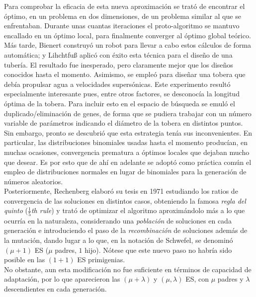 \documentclass[12pt]{article} \usepackage[utf8]{inputenc}
\begin{document}
Para comprobar la eficacia de esta nueva aproximación se trató de
encontrar el óptimo, en un problema en dos dimensiones, de un problema
similar al que se enfrentaban. Durante unas cuantas iteraciones el
proto-algoritmo se mantuvo encallado en un óptimo local, para
finalmente converger al óptimo global teórico. \\

Más tarde, Bienert construyó un robot para llevar a cabo estos
cálculos de forma automática; y Lihchtfu{\ss} aplicó con éxito esta técnica para
el diseño de una tubería. El resultado fue inesperado, pero claramente
mejor que los diseños conocidos hasta el momento. Asimismo, se empleó
para diseñar una tobera que debía propulsar agua a velocidades
supersónicas. Este experimento resultó especialmente interesante pues,
entre otros factores, se desconocía la longitud óptima de la
tobera. Para incluir esto en el espacio de búsqueda se emuló el
duplicado/eliminación de genes, de forma que se pudiera trabajar con un número
variable de parámetros indicando el diámetro de la tobera en distintos
puntos. \\

Sin embargo, pronto se descubrió que esta estrategia tenía sus
inconvenientes. En particular, las distribuciones binomiales usadas
hasta el momento producían, en muchas ocasiones, convergencia
prematura a óptimos locales que dejaban mucho que desear. Es por esto
que de ahí en adelante se adoptó como práctica común el empleo de
distribuciones normales en lugar de binomiales para la generación de
números aleatorios. \\

Posteriormente, Rechenberg elaboró su tesis en 1971 estudiando los
ratios de convergencia de las soluciones en distintos casos,
obteniendo la famosa \textit{regla del quinto} (\textit{$\frac 1 5$th
  rule}) y trató de optimizar el algoritmo aproximándolo más a lo que
ocurría en la naturaleza, considerando una \textit{población} de
soluciones en cada generación e introduciendo el paso de la
\textit{recombinación} de soluciones además de la mutación, dando
lugar a lo que, en la notación de Schwefel, se denominó $(\mu + 1)$ ES
($\mu$ padres, $1$ hijo). Nótese que este nuevo paso no habría sido posible en
las $(1 + 1)$ ES primigenias. \\

No obstante, aun esta modificación no fue suficiente en términos de
capacidad de adaptación, por lo que aparecieron las $(\mu + \lambda)$
y $(\mu, \lambda)$ ES, con $\mu$ padres y $\lambda$ descendientes en
cada generación. \\
\end{document}
